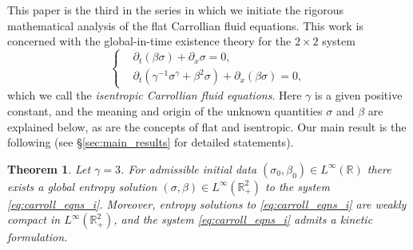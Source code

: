 \documentclass[11pt,a4paper,reqno]{amsart}
\numberwithin{equation}{section}
\newtheorem*{theorem*}{Theorem}
\theoremstyle{definition}
\theoremstyle{remark}
\begin{document}
This paper is the third in the series \cite{AthanasiouPetropoulosSchulzTaujanskas24a,AthanasiouPetropoulosSchulzTaujanskas24b} in which we initiate the rigorous mathematical analysis of the flat Carrollian fluid equations. This work is concerned with the global-in-time existence theory for the $2 \times 2$ system 
\begin{equation}\label{eq:carroll_eqns_i}
    \left\lbrace\begin{aligned}
        &\partial_t (\beta \sigma) + \partial_x \sigma = 0, \\ 
        & \partial_t \left(\gamma^{-1} \sigma^\gamma + \beta^2 \sigma\right) + \partial_x (\beta \sigma) = 0,
    \end{aligned}\right.
\end{equation}
which we call the \emph{isentropic Carrollian fluid equations}. Here $\gamma$ is a given positive constant, and the meaning and origin of the unknown quantities $\sigma$ and $\beta$ are explained below, as are the concepts of flat and isentropic. Our main result is the following (see \S\ref{sec:main_results} for detailed statements).

\begin{theorem*}
    Let $\gamma = 3$. For admissible initial data $(\sigma_0, \beta_0) \in L^\infty(\mathbb{R})$ there exists a global entropy solution $(\sigma, \beta) \in L^\infty(\mathbb{R}^2_+)$ to the system \eqref{eq:carroll_eqns_i}. Moreover, entropy solutions to \eqref{eq:carroll_eqns_i} are weakly compact in $L^\infty(\mathbb{R}^2_+)$, and the system \eqref{eq:carroll_eqns_i} admits a kinetic formulation.
\end{theorem*}
%
\end{document}
